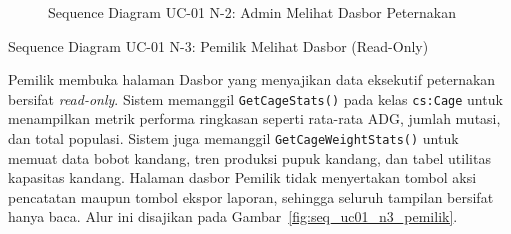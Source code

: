 \begin{figure}[htbp]
\centering
{}
\caption{Sequence Diagram UC-01 N-2: Admin Melihat Dasbor Peternakan}
\label{fig:seq_uc01_n2_admin}
\end{figure}

\newpage

\item{Sequence Diagram UC-01 N-3: Pemilik Melihat Dasbor (Read-Only)}

Pemilik membuka halaman Dasbor yang menyajikan data eksekutif peternakan
bersifat \textit{read-only}. Sistem memanggil \texttt{GetCageStats()} pada
kelas \texttt{cs:Cage} untuk menampilkan metrik performa ringkasan seperti
rata-rata ADG, jumlah mutasi, dan total populasi. Sistem juga memanggil
\texttt{GetCageWeightStats()} untuk memuat data bobot kandang, tren produksi
pupuk kandang, dan tabel utilitas kapasitas kandang. Halaman dasbor Pemilik
tidak menyertakan tombol aksi pencatatan maupun tombol ekspor laporan,
sehingga seluruh tampilan bersifat hanya baca. Alur ini disajikan pada
Gambar~\ref{fig:seq_uc01_n3_pemilik}.

